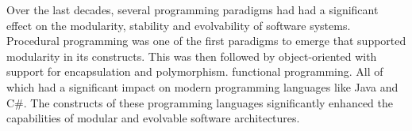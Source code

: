 Over the last decades, several programming paradigms had had a significant effect on the
modularity, stability and evolvability of software systems. Procedural programming was one
of the first paradigms to emerge that supported modularity in its constructs. This was
then followed by object-oriented with support for encapsulation and polymorphism.
functional programming. All of which had a significant impact on modern programming
languages like Java and C\#. The constructs of these programming languages significantly
enhanced the capabilities of modular and evolvable software architectures. 








